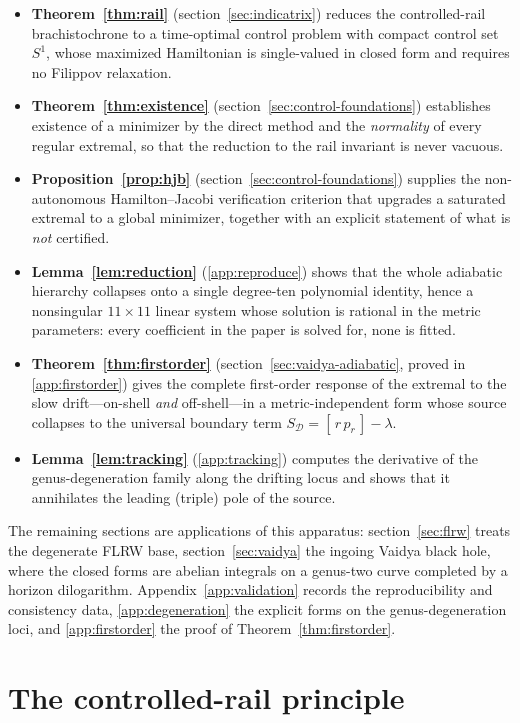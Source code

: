 \documentclass[12pt]{iopart}
\theoremstyle{plain}
\theoremstyle{definition}
\theoremstyle{plain}
\theoremstyle{remark}
\begin{document}
\begin{itemize}\itemsep2pt
\item \textbf{Theorem~\ref{thm:rail}} (section~\ref{sec:indicatrix}) reduces the
controlled-rail brachistochrone to a time-optimal control problem with compact control set
$S^1$, whose maximized Hamiltonian is single-valued in closed form and requires no
Filippov relaxation.
\item \textbf{Theorem~\ref{thm:existence}} (section~\ref{sec:control-foundations})
establishes existence of a minimizer by the direct method and the \emph{normality} of every
regular extremal, so that the reduction to the rail invariant is never vacuous.
\item \textbf{Proposition~\ref{prop:hjb}} (section~\ref{sec:control-foundations}) supplies
the non-autonomous Hamilton--Jacobi verification criterion that upgrades a saturated
extremal to a global minimizer, together with an explicit statement of what is
\emph{not} certified.
\item \textbf{Lemma~\ref{lem:reduction}} (\ref{app:reproduce}) shows that the whole
adiabatic hierarchy collapses onto a single degree-ten polynomial identity, hence a
nonsingular $11\times11$ linear system whose solution is rational in the metric
parameters: every coefficient in the paper is solved for, none is fitted.
\item \textbf{Theorem~\ref{thm:firstorder}} (section~\ref{sec:vaidya-adiabatic}, proved in
\ref{app:firstorder}) gives the complete first-order response of the extremal to the slow
drift---on-shell \emph{and} off-shell---in a metric-independent form whose source collapses
to the universal boundary term $S_{\mathcal D}=[\,r\,p_r\,]-\lambda$.
\item \textbf{Lemma~\ref{lem:tracking}} (\ref{app:tracking}) computes the derivative of the
genus-degeneration family along the drifting locus and shows that it annihilates the
leading (triple) pole of the source.
\end{itemize}
The remaining sections are applications of this apparatus: section~\ref{sec:flrw} treats
the degenerate FLRW base, section~\ref{sec:vaidya} the ingoing Vaidya black hole, where
the closed forms are abelian integrals on a genus-two curve completed by a horizon
dilogarithm. Appendix~\ref{app:validation} records the reproducibility and consistency
data, \ref{app:degeneration} the explicit forms on the genus-degeneration loci, and
\ref{app:firstorder} the proof of Theorem~\ref{thm:firstorder}.

\section{The controlled-rail principle}
\label{sec:principle}
\end{document}
